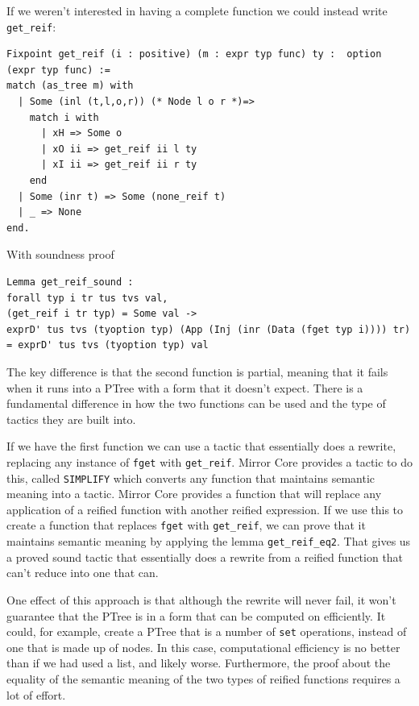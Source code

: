 \documentclass{puthesis}
\begin{document}
If we weren't interested in having a complete function we could
instead write \lstinline|get_reif|:

\begin{lstlisting}
Fixpoint get_reif (i : positive) (m : expr typ func) ty :  option (expr typ func) :=
match (as_tree m) with
  | Some (inl (t,l,o,r)) (* Node l o r *)=>
    match i with 
      | xH => Some o
      | xO ii => get_reif ii l ty 
      | xI ii => get_reif ii r ty 
    end
  | Some (inr t) => Some (none_reif t)
  | _ => None
end.
\end{lstlisting}

With soundness proof

\begin{lstlisting}
Lemma get_reif_sound :
forall typ i tr tus tvs val,
(get_reif i tr typ) = Some val ->
exprD' tus tvs (tyoption typ) (App (Inj (inr (Data (fget typ i)))) tr)
= exprD' tus tvs (tyoption typ) val
\end{lstlisting}

The key difference is that the second function is partial, meaning
that it 
fails when it runs into a PTree with a form that it doesn't expect. There is a
fundamental difference in how the two functions can be used and the
type of tactics they are built into. 

If we have the first function we can use a tactic that essentially
does a rewrite, replacing any instance of \lstinline|fget| with
\lstinline|get_reif|. Mirror Core provides a tactic to do this, called
\lstinline|SIMPLIFY| which converts any function that maintains
semantic meaning into a tactic. Mirror Core provides a function that
will replace any application of a reified function with another
reified expression. If we use this to create a function that replaces
\lstinline|fget| with \lstinline|get_reif|, we can prove that it
maintains semantic meaning by applying the lemma
\lstinline|get_reif_eq2|. That gives us a proved sound tactic that
essentially does a rewrite from a reified function that can't reduce
into one that can. 

One effect of this approach is that although the rewrite will never
fail, it won't guarantee that the PTree is in a form that can be
computed on efficiently. It could, for example, create a PTree that is
a number of \lstinline|set| operations, instead of one that is made up
of nodes. In this case, computational efficiency is no better than if
we had used a list, and likely worse. Furthermore, the proof about the
equality of the semantic meaning of the two types of reified functions
requires a lot of effort.
\end{document}
